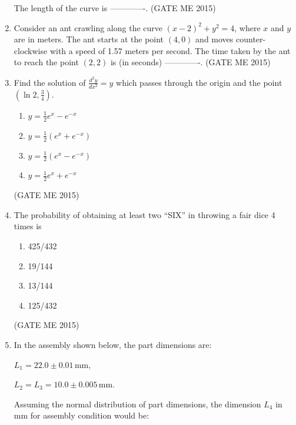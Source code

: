 \documentclass[journal]{IEEEtran}
\begin{document}
\begin{enumerate}
The length of the curve is -------------.
\hfill  (GATE ME 2015)

\item Consider an ant crawling along the curve $(x - 2)^2 + y^2 = 4$, where $x$ and $y$ are in meters. The ant starts at the point $(4, 0)$ and moves counter-clockwise with a speed of 1.57 meters per second. The time taken by the ant to reach the point $(2, 2)$ is (in seconds) -------------.
\hfill  (GATE ME 2015)

\item Find the solution of $ \frac{d^2 y}{dx^2} = y $ which passes through the origin and the point $ (\ln 2, \frac{3}{4}) $.

\begin{enumerate}
    \item $ y = \frac{1}{2} e^x - e^{-x} $
    \item $ y = \frac{1}{2} (e^x + e^{-x}) $
    \item $ y = \frac{1}{2} (e^x - e^{-x}) $
    \item $ y = \frac{1}{2} e^x + e^{-x} $
\end{enumerate}
\hfill  (GATE ME 2015)

\item The probability of obtaining at least two “SIX” in throwing a fair dice 4 times is

\begin{multicols}{4}
\begin{enumerate}
    \item 425/432
    \item 19/144
    \item 13/144
    \item 125/432
\end{enumerate}
\end{multicols}
\hfill  (GATE ME 2015)

\item In the assembly shown below, the part dimensions are:

$L_1 = 22.0 \pm 0.01 \, \text{mm},$

$L_2 = L_3 = 10.0 \pm 0.005 \, \text{mm}.$

Assuming the normal distribution of part dimensions, the dimension $L_4$ in mm for assembly condition would be:


\end{enumerate}
\end{document}
